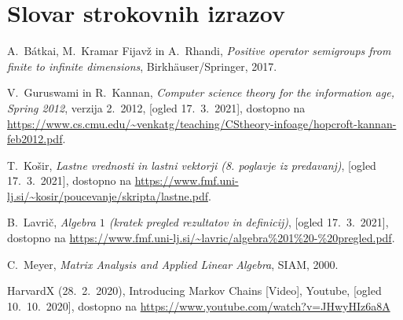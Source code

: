 \documentclass[mat1]{fmfdelo}
\begin{document}
\section*{Slovar strokovnih izrazov}

\geslo{}{}
\geslo{}{}

\begin{thebibliography}{99}

 A.~B\'{a}tkai, M.~Kramar Fijavž in A.~Rhandi, \emph{Positive operator semigroups from finite to infinite dimensions}, Birkh\"{a}user/Springer, 2017.

 V.~Guruswami in R.~Kannan, \emph{Computer science theory for the information age, Spring 2012}, verzija 2.~2012, [ogled 17.~3.~2021], dostopno na \url{https://www.cs.cmu.edu/~venkatg/teaching/CStheory-infoage/hopcroft-kannan-feb2012.pdf}.

 T.~Košir, \emph{Lastne vrednosti in lastni vektorji (8. poglavje iz predavanj)}, [ogled 17.~3.~2021], dostopno na \url{https://www.fmf.uni-lj.si/~kosir/poucevanje/skripta/lastne.pdf}.

 B.~Lavrič, \emph{Algebra $1$ (kratek pregled rezultatov in definicij)}, [ogled 17.~3.~2021], dostopno na \url{https://www.fmf.uni-lj.si/~lavric/algebra%201%20-%20pregled.pdf}.

 C.~Meyer, \emph{Matrix Analysis and Applied Linear Algebra}, SIAM, 2000.

 HarvardX (28.~2.~2020), Introducing Markov Chains [Video], Youtube, [ogled 10.~10.~2020], dostopno na \url{https://www.youtube.com/watch?v=JHwyHIz6a8A}


\end{thebibliography}
\end{document}
